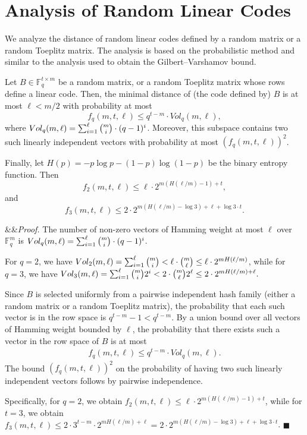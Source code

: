 \documentclass[orivec,envcountsect]{llncs}
\renewenvironment{proof}[1][]
    {\noindent
       \ifx&#1&{\it Proof.}
       \else{\it Proof ({#1}).}
       \fi}{\hfill $\blacksquare$}
\begin{document}



\appendix

\section{Analysis of Random Linear Codes}
\label{app:distance}

We analyze the distance of random linear codes defined by a random matrix
or a random Toeplitz matrix.
The analysis is based on the probabilistic method and
similar to the analysis used to obtain the Gilbert–Varshamov bound.

\begin{proposition}
\label{prop:hw}
Let $B \in \mathbb{F}^{t \times m}_{q}$ be a random matrix, or a random Toeplitz matrix whose rows define
a linear code.
Then, the minimal distance of (the code defined by) $B$ is at most $\ell < m/2$ with probability at most
$$f_q(m,t,\ell) \leq q^{t-m} \cdot Vol_q(m,\ell),$$
where $Vol_q(m,\ell) = \sum_{i=1}^\ell \tbinom{m}{i} \cdot (q-1)^{i}$.
Moreover, this subspace contains two such linearly independent vectors with probability at most $(f_q(m,t,\ell))^2$.

Finally, let $H(p) = - p \log p - (1-p) \log(1-p)$ be the binary entropy function.
Then
$$f_2(m,t,\ell) \leq \ell \cdot 2^{m (H(\ell/m) - 1) + t},$$
and
$$f_3(m,t,\ell) \leq 2 \cdot 2^{m (H(\ell/m) - \log 3) + \ell + \log 3 \cdot t}.$$
\end{proposition}

\begin{proof}The number of non-zero vectors of Hamming weight at most $\ell$ over $\mathbb{F}_q^m$ is
$Vol_q(m,\ell) = \sum_{i=1}^\ell \tbinom{m}{i} \cdot (q-1)^{i}$.

For $q = 2$, we have
$Vol_2(m,\ell) = \sum_{i=1}^\ell \tbinom{m}{i} <
\ell \cdot \tbinom{m}{\ell} \leq
\ell \cdot 2^{m H(\ell/m)}$, while for $q = 3$, we have
$Vol_3(m,\ell) = \sum_{i=1}^\ell \tbinom{m}{i} 2^i <
2 \cdot \tbinom{m}{\ell} 2^\ell \leq
2 \cdot 2^{m H(\ell/m) + \ell}.$

Since $B$ is selected uniformly from a pairwise independent hash family (either a random matrix or a random Toeplitz matrix),
the probability that each such vector is in the row space is $q^{t-m} - 1 < q^{t-m}$. By a union bound over all vectors of Hamming weight bounded by $\ell$, the probability that there exists such a vector in the row space of $B$ is at most
\begin{align*}
f_q(m,t,\ell) \leq q^{t-m} \cdot Vol_q(m,\ell).
\end{align*}
The bound $(f_q(m,t,\ell))^2$ on the probability of having two such linearly independent vectors follows by pairwise independence.

Specifically, for $q = 2$, we obtain
$f_2(m,t,\ell) \leq \ell \cdot 2^{m (H(\ell/m) - 1) + t}$,
while for $t = 3$, we obtain
$f_3(m,t,\ell) \leq 2 \cdot 3^{t-m} \cdot 2^{m H(\ell/m) + \ell} = 2 \cdot 2^{m (H(\ell/m) - \log 3) + \ell + \log 3 \cdot t}$.
\end{proof}
\end{document}
